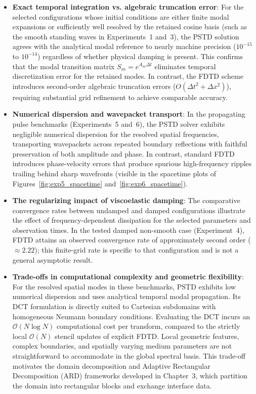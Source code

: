 \documentclass{Configuration_Files/PoliMi3i_thesis}
\newif\ifshowthesischanges
\DeclareRobustCommand{\thesischange}[2]{%
    \ifshowthesischanges
        \textcolor{#1}{#2}%
    \else
        #2%
    \fi
}
\def\thesischange#1#2{#2}%
\begin{document}
\begin{itemize}
    \item \thesischange{red}{\textbf{Exact temporal integration vs. algebraic truncation error}: For the selected configurations whose initial conditions are either finite modal expansions or sufficiently well resolved by the retained cosine basis (such as the smooth standing waves in Experiments~1 and~3), the PSTD solution agrees with the analytical modal reference to nearly machine precision ($10^{-15}$ to $10^{-14}$) regardless of whether physical damping is present. This confirms that the modal transition matrix $S_m = e^{A_m \Delta t}$ eliminates temporal discretization error for the retained modes. In contrast, the FDTD scheme introduces second-order algebraic truncation errors ($O(\Delta t^2 + \Delta x^2)$), requiring substantial grid refinement to achieve comparable accuracy.}

    \item \thesischange{red}{\textbf{Numerical dispersion and wavepacket transport}: In the propagating pulse benchmarks (Experiments~5 and~6), the PSTD solver exhibits negligible numerical dispersion for the resolved spatial frequencies, transporting wavepackets across repeated boundary reflections with faithful preservation of both amplitude and phase. In contrast, standard FDTD introduces phase-velocity errors that produce spurious high-frequency ripples trailing behind sharp wavefronts (visible in the spacetime plots of Figures~\ref{fig:exp5_spacetime} and~\ref{fig:exp6_spacetime}).}

    \item \thesischange{red}{\textbf{The regularizing impact of viscoelastic damping}: The comparative convergence rates between undamped and damped configurations illustrate the effect of frequency-dependent dissipation for the selected parameters and observation times. In the tested damped non-smooth case (Experiment~4), FDTD attains an observed convergence rate of approximately second order ($\approx 2.22$); this finite-grid rate is specific to that configuration and is not a general asymptotic result.}

    \item \thesischange{red}{\textbf{Trade-offs in computational complexity and geometric flexibility}: For the resolved spatial modes in these benchmarks, PSTD exhibits low numerical dispersion and uses analytical temporal modal propagation. Its DCT formulation is directly suited to Cartesian subdomains with homogeneous Neumann boundary conditions. Evaluating the DCT incurs an $\mathcal{O}(N \log N)$ computational cost per transform, compared to the strictly local $\mathcal{O}(N)$ stencil updates of explicit FDTD. Local geometric features, complex boundaries, and spatially varying medium parameters are not straightforward to accommodate in the global spectral basis. This trade-off motivates the domain decomposition and Adaptive Rectangular Decomposition (ARD) frameworks developed in Chapter~3, which partition the domain into rectangular blocks and exchange interface data.}
\end{itemize}
\end{document}
